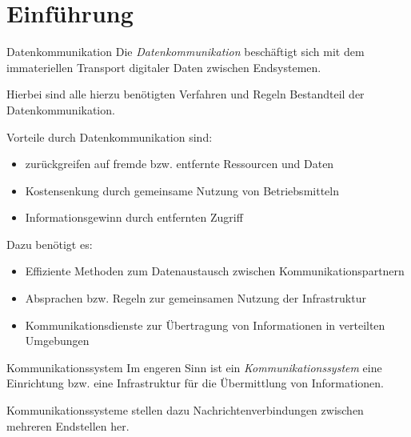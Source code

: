 \section{Einführung}

\begin{defi}{Datenkommunikation}
    Die \emph{Datenkommunikation} beschäftigt sich mit dem immateriellen Transport digitaler Daten zwischen Endsystemen.

    Hierbei sind alle hierzu benötigten Verfahren und Regeln Bestandteil der Datenkommunikation.

    Vorteile durch Datenkommunikation sind:
    \begin{itemize}
        \item zurückgreifen auf fremde bzw. entfernte Ressourcen und Daten
        \item Kostensenkung durch gemeinsame Nutzung von Betriebsmitteln
        \item Informationsgewinn durch entfernten Zugriff
    \end{itemize}

    Dazu benötigt es:
    \begin{itemize}
        \item Effiziente Methoden zum Datenaustausch zwischen Kommunikationspartnern
        \item Absprachen bzw. Regeln zur gemeinsamen Nutzung der Infrastruktur
        \item Kommunikationsdienste zur Übertragung von Informationen in verteilten Umgebungen
    \end{itemize}
\end{defi}

\begin{defi}{Kommunikationssystem}
    Im engeren Sinn ist ein \emph{Kommunikationssystem} eine Einrichtung bzw. eine Infrastruktur für die Übermittlung von Informationen.

    Kommunikationssysteme stellen dazu Nachrichtenverbindungen zwischen mehreren Endstellen her.
\end{defi}